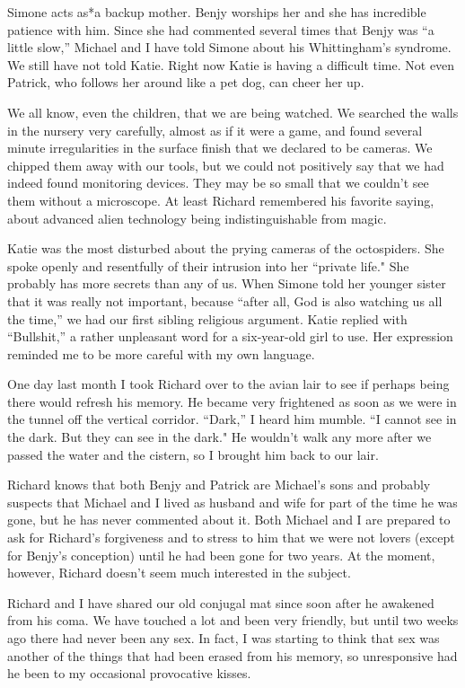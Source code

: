 \documentclass[]{article}
\begin{document}
{Simone acts as*a backup mother.  Benjy worships her and she has incredible patience with him.  Since she had commented several times that Benjy was “a little slow,” Michael and I have told Simone about his Whittingham’s syndrome.  We still have not told Katie.  Right now Katie is having a difficult time.  Not even Patrick, who follows her around like a pet dog, can cheer her up.

We all know, even the children, that we are being watched.  We searched the walls in the nursery very carefully, almost as if it were a game, and found several minute irregularities in the surface finish that we declared to be cameras.  We chipped them away with our tools, but we could not positively say that we had indeed found monitoring devices.  They may be so small that we couldn’t see them without a microscope.  At least Richard remembered his favorite saying, about advanced alien technology being indistinguishable from magic.

Katie was the most disturbed about the prying cameras of the octospiders.  She spoke openly and resentfully of their intrusion into her “private life."  She probably has more secrets than any of us.  When Simone told her younger sister that it was really not important, because “after all, God is also watching us all the time,” we had our first sibling religious argument.  Katie replied with “Bullshit,” a rather unpleasant word for a six-year-old girl to use.  Her expression reminded me to be more careful with my own language.

One day last month I took Richard over to the avian lair to see if perhaps being there would refresh his memory.  He became very frightened as soon as we were in the tunnel off the vertical corridor.  “Dark,” I heard him mumble.  “I cannot see in the dark.  But they can see in the dark."  He wouldn’t walk any more after we passed the water and the cistern, so I brought him back to our lair.

Richard knows that both Benjy and Patrick are Michael’s sons and probably suspects that Michael and I lived as husband and wife for part of the time he was gone, but he has never commented about it.  Both Michael and I are prepared to ask for Richard’s forgiveness and to stress to him that we were not lovers (except for Benjy’s conception) until he had been gone for two years.  At the moment, however, Richard doesn’t seem much interested in the subject.

Richard and I have shared our old conjugal mat since soon after he awakened from his coma.  We have touched a lot and been very friendly, but until two weeks ago there had never been any sex.  In fact, I was starting to think that sex was another of the things that had been erased from his memory, so unresponsive had he been to my occasional provocative kisses.

}
\end{document}
